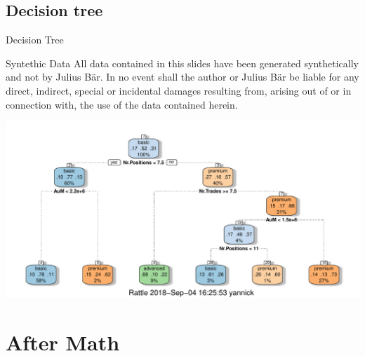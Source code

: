 \documentclass{beamer}\usepackage[]{graphicx}\usepackage[]{color}
\newenvironment{knitrout}{}{} %
\begin{document}
\subsection{Decision tree}
\begin{frame}[fragile]{Decision Tree}
\tiny

{
\begin{block}{\tiny Syntethic Data}
All data contained in this slides have been generated synthetically and not by Julius B\"{a}r. In no event shall the author or Julius B\"{a}r be liable for any direct, indirect, special or incidental damages resulting from, arising out of or in connection with, the use of the data contained herein.
\end{block}
}
\begin{knitrout}
\color{fgcolor}
\includegraphics[width=\linewidth]{figure/plots_tree-1} 

\end{knitrout}

\end{frame}

\section{After Math}
\end{document}

